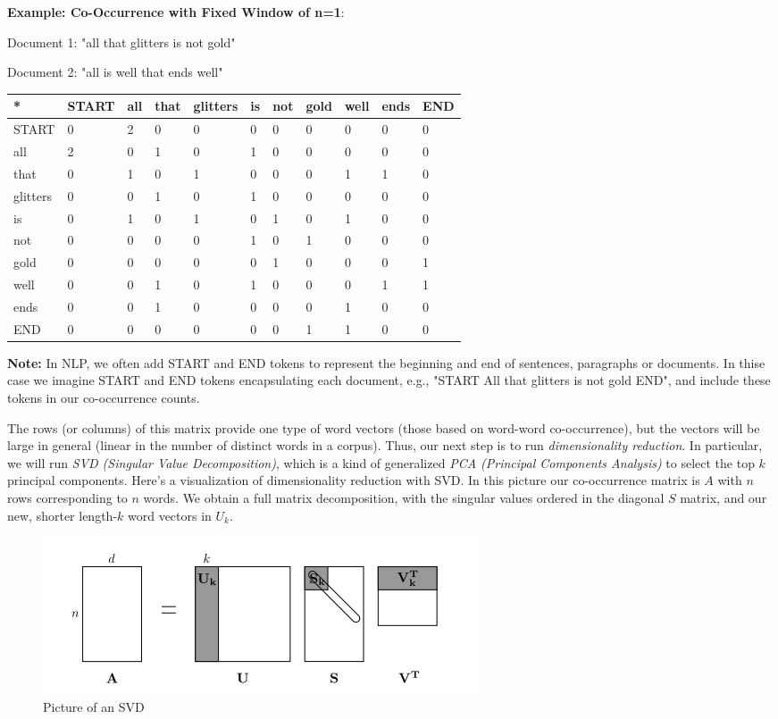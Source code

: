 \documentclass[11pt]{article}
\makeatletter
\def\maxwidth{\ifdim\Gin@nat@width>\linewidth\linewidth
    \else\Gin@nat@width\fi}
\let\Oldincludegraphics\includegraphics
\renewcommand{\includegraphics}[1]{\Oldincludegraphics[width=.8\maxwidth]{#1}}
\makeatother
\begin{document}
\textbf{Example: Co-Occurrence with Fixed Window of n=1}:

Document 1: "all that glitters is not gold"

Document 2: "all is well that ends well"

\begin{longtable}[]{@{}lllllllllll@{}}
\toprule
* & START & all & that & glitters & is & not & gold & well & ends &
END\tabularnewline
\midrule
\endhead
START & 0 & 2 & 0 & 0 & 0 & 0 & 0 & 0 & 0 & 0\tabularnewline
all & 2 & 0 & 1 & 0 & 1 & 0 & 0 & 0 & 0 & 0\tabularnewline
that & 0 & 1 & 0 & 1 & 0 & 0 & 0 & 1 & 1 & 0\tabularnewline
glitters & 0 & 0 & 1 & 0 & 1 & 0 & 0 & 0 & 0 & 0\tabularnewline
is & 0 & 1 & 0 & 1 & 0 & 1 & 0 & 1 & 0 & 0\tabularnewline
not & 0 & 0 & 0 & 0 & 1 & 0 & 1 & 0 & 0 & 0\tabularnewline
gold & 0 & 0 & 0 & 0 & 0 & 1 & 0 & 0 & 0 & 1\tabularnewline
well & 0 & 0 & 1 & 0 & 1 & 0 & 0 & 0 & 1 & 1\tabularnewline
ends & 0 & 0 & 1 & 0 & 0 & 0 & 0 & 1 & 0 & 0\tabularnewline
END & 0 & 0 & 0 & 0 & 0 & 0 & 1 & 1 & 0 & 0\tabularnewline
\bottomrule
\end{longtable}

\textbf{Note:} In NLP, we often add START and END tokens to represent
the beginning and end of sentences, paragraphs or documents. In thise
case we imagine START and END tokens encapsulating each document, e.g.,
"START All that glitters is not gold END", and include these tokens in
our co-occurrence counts.

The rows (or columns) of this matrix provide one type of word vectors
(those based on word-word co-occurrence), but the vectors will be large
in general (linear in the number of distinct words in a corpus). Thus,
our next step is to run \emph{dimensionality reduction}. In particular,
we will run \emph{SVD (Singular Value Decomposition)}, which is a kind
of generalized \emph{PCA (Principal Components Analysis)} to select the
top \(k\) principal components. Here's a visualization of dimensionality
reduction with SVD. In this picture our co-occurrence matrix is \(A\)
with \(n\) rows corresponding to \(n\) words. We obtain a full matrix
decomposition, with the singular values ordered in the diagonal \(S\)
matrix, and our new, shorter length-\(k\) word vectors in \(U_k\).

\begin{figure}
\centering
\includegraphics{imgs/svd.png}
\caption{Picture of an SVD}
\end{figure}
\end{document}
